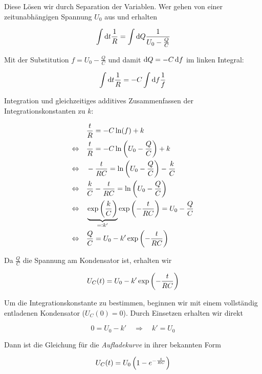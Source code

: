 \documentclass[a4paper,german,12pt,smallheadings]{scrartcl}
\begin{document}
Diese Lösen wir durch Separation der Variablen. Wer gehen von einer
zeitunabhängigen Spannung $U_0$ aus und erhalten

\begin{equation}
  \int \dif t \frac{1}{R} = \int \dif Q \frac{1}{U_0 - \frac{Q}{C}}
\end{equation}

Mit der Substitution $f = U_0 - \frac{Q}{C}$ und damit $\dif Q = -C \dif f$ im
linken Integral:

\begin{equation}
  \int \dif t \frac{1}{R} = -C \int \dif f \frac{1}{f}
\end{equation}

Integration und gleichzeitiges additives Zusammenfassen der
Integrationskonstanten zu $k$:

\begin{align*}
  &\frac{t}{R} = -C \ln(f) + k \\
  \Leftrightarrow\quad&
  \frac{t}{R} = -C \ln\del{U_0 - \frac{Q}{C}} + k \\
  \Leftrightarrow\quad&
  -\frac{t}{RC} = \ln\del{U_0 - \frac{Q}{C}} - \frac{k}{C} \\
  \Leftrightarrow\quad&
  \frac{k}{C}-\frac{t}{RC} = \ln\del{U_0 - \frac{Q}{C}} \\
  \Leftrightarrow\quad&
  \underbrace{\exp\del{\frac{k}{C}}}_{=: k'} \exp \del{-\frac{t}{RC}} = U_0 - \frac{Q}{C} \\
  \Leftrightarrow\quad&
  \frac{Q}{C} = U_0 - k' \exp \del{-\frac{t}{RC}}
\end{align*}

Da $\frac{Q}{C}$ die Spannung am Kondensator ist, erhalten wir

\begin{equation}
  U_C(t) = U_0 - k' \exp \del{-\frac{t}{RC}}
\end{equation}

Um die Integrationskonstante zu bestimmen, beginnen wir mit einem vollständig
entladenen Kondensator ($U_C(0) = 0$). Durch Einsetzen erhalten wir direkt

\begin{equation}
  0 = U_0 - k' \quad \Rightarrow \quad k' = U_0
\end{equation}

Dann ist die Gleichung für die \textit{Aufladekurve} in ihrer bekannten Form

\begin{equation}
  U_C(t) = U_0 \del{1 - e^{-\frac{t}{RC}}}
\end{equation}
\end{document}
